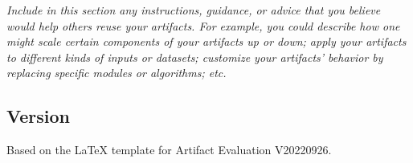 \documentclass[nonacm,sigconf]{acmart}
\begin{document}
\emph{Include in this section any instructions, guidance, or advice
that you believe would help others reuse your artifacts.  For example,
you could describe how one might scale certain components of your
artifacts up or down; apply your artifacts to different kinds of
inputs or datasets; customize your artifacts' behavior by replacing
specific modules or algorithms; etc.}


\subsection{Version}
Based on the LaTeX template for Artifact Evaluation V20220926.








\end{document}
